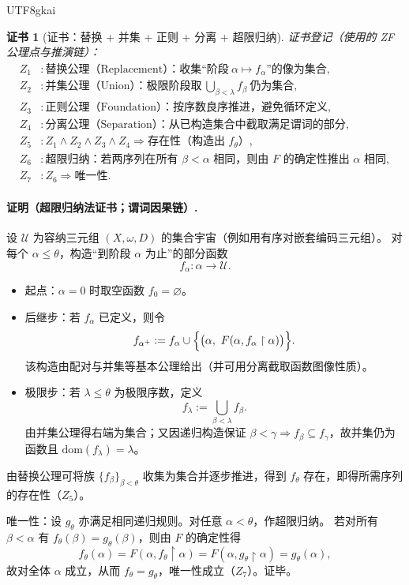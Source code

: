 \documentclass[12pt]{article}
\newtheorem{Certificate}{证书}[section]
\begin{document}
\begin{CJK*}{UTF8}{gkai}
\begin{Certificate}[证书：替换 + 并集 + 正则 + 分离 + 超限归纳]
\label{cert:tex29-top-transfinite-recursion}
证书登记（使用的 ZF 公理点与推演链）：
\[
\begin{aligned}
  Z_1 &: \text{替换公理（Replacement）：收集“阶段}\ \alpha\mapsto f_\alpha\text{”的像为集合},\\
  Z_2 &: \text{并集公理（Union）：极限阶段取}\ \bigcup_{\beta<\lambda}f_\beta\ \text{仍为集合},\\
  Z_3 &: \text{正则公理（Foundation）：按序数良序推进，避免循环定义},\\
  Z_4 &: \text{分离公理（Separation）：从已构造集合中截取满足谓词的部分},\\
  Z_5 &: Z_1\wedge Z_2\wedge Z_3\wedge Z_4\Rightarrow \text{存在性（构造出 }f_\theta\text{）},\\
  Z_6 &: \text{超限归纳：若两序列在所有 }\beta<\alpha\text{ 相同，则由 }F\text{ 的确定性推出 }\alpha\text{ 相同},\\
  Z_7 &: Z_6\Rightarrow \text{唯一性}.
\end{aligned}
\]
\end{Certificate}

\paragraph{证明（超限归纳法证书；谓词因果链）.}
设 $\mathcal{U}$ 为容纳三元组 $(X,\omega,D)$ 的集合宇宙（例如用有序对嵌套编码三元组）。
对每个 $\alpha\le \theta$，构造“到阶段 $\alpha$ 为止”的部分函数
\[
  f_\alpha:\alpha\to \mathcal{U}.
\]
\begin{itemize}
  \item 起点：$\alpha=0$ 时取空函数 $f_0=\varnothing$。
  \item 后继步：若 $f_\alpha$ 已定义，则令
  \[
    f_{\alpha^{+}}
    :=
    f_\alpha\cup\Bigl\{\bigl(\alpha,\ F(\alpha,f_\alpha\upharpoonright \alpha)\bigr)\Bigr\}.
  \]
  该构造由配对与并集等基本公理给出（并可用分离截取函数图像性质）。
  \item 极限步：若 $\lambda\le\theta$ 为极限序数，定义
  \[
    f_\lambda:=\bigcup_{\beta<\lambda} f_\beta.
  \]
  由并集公理得右端为集合；又因递归构造保证 $\beta<\gamma\Rightarrow f_\beta\subseteq f_\gamma$，故并集仍为函数且 $\mathrm{dom}(f_\lambda)=\lambda$。
\end{itemize}
由替换公理可将族 $\{f_\beta\}_{\beta<\theta}$ 收集为集合并逐步推进，得到 $f_\theta$ 存在，即得所需序列的存在性（$Z_5$）。

唯一性：设 $g_\theta$ 亦满足相同递归规则。对任意 $\alpha<\theta$，作超限归纳。
若对所有 $\beta<\alpha$ 有 $f_\theta(\beta)=g_\theta(\beta)$，则由 $F$ 的确定性得
\[
  f_\theta(\alpha)=F(\alpha,f_\theta\upharpoonright \alpha)=F(\alpha,g_\theta\upharpoonright \alpha)=g_\theta(\alpha),
\]
故对全体 $\alpha$ 成立，从而 $f_\theta=g_\theta$，唯一性成立（$Z_7$）。证毕。


\end{CJK*}
\end{document}
